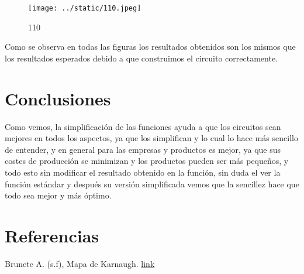\documentclass{article}
\begin{document}
\begin{multicols}{2}
\begin{figure}[H]
	\centering
	\texttt{[image: ../static/110.jpeg]}
	\caption{110}
	\label{fig:7}
\end{figure}

Como se observa en todas las figuras los resultados obtenidos son los mismos que los resultados esperados debido a que construimos el circuito correctamente.

\section*{Conclusiones}\label{Conclusiones}
Como vemos, la simplificación de las funciones ayuda a que los circuitos sean mejores en todos los aspectos, ya que los simplifican y lo cual lo hace más sencillo de entender, y en general para las empresas y productos es mejor, ya que sus costes de producción se minimizan y los productos pueden ser más pequeños, y todo esto sin modificar el resultado obtenido en la función, sin duda el ver la función estándar y después su versión simplificada vemos que la sencillez hace que todo sea mejor y más óptimo.
\section*{Referencias}\label{Referencias}	
Brunete A. (s.f), Mapa de Karnaugh.
\href{https://bookdown.org/alberto_brunete/intro_automatica/mapa-de-karnaugh.html}{link}

\end{multicols}
\end{document}
